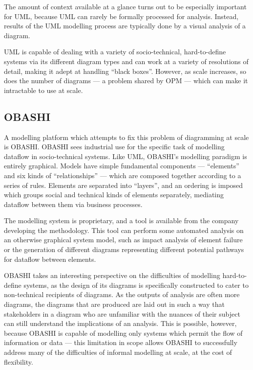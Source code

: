 \documentclass[draft]{article}
\begin{document}
The amount of context available at a glance turns out to be especially important
for UML, because UML can rarely be formally processed for analysis. Instead,
results of the UML modelling process are typically done by a visual analysis of
a diagram.\par

UML is capable of dealing with a variety of socio-technical, hard-to-define
systems via its different diagram types and can work at a variety of resolutions
of detail, making it adept at handling ``black boxes''. However, as scale
increases, so does the number of diagrams --- a problem shared by OPM --- which
can make it intractable to use at scale.\par

\subsection{OBASHI}
\label{subsec:obashi}
A modelling platform which attempts to fix this problem of diagramming at
scale is OBASHI\cite{obashi_methodology}. OBASHI sees industrial use for the
specific task of modelling dataflow in socio-technical systems. Like UML,
OBASHI's modelling paradigm is entirely graphical. Models have simple
fundamental components --- ``elements'' and six kinds of ``relationships'' ---
which are composed together according to a series of rules. Elements are
separated into ``layers'', and an ordering is imposed which groups social and
technical kinds of elements separately, mediating dataflow between them via
business processes.\par

The modelling system is proprietary, and a tool is available from the company
developing the methodology. This tool can perform some automated analysis on an
otherwise graphical system model, such as impact analysis of element failure or
the generation of different diagrams representing different potential pathways
for dataflow between elements.\par

OBASHI takes an interesting perspective on the difficulties of modelling
hard-to-define systems, as the design of its diagrams is specifically
constructed to cater to non-technical recipients of diagrams. As the outputs of
analysis are often more diagrams, the diagrams that are produced are laid out in
such a way that stakeholders in a diagram who are unfamiliar with the nuances of
their subject can still understand the implications of an analysis. This is
possible, however, because OBASHI is capable of modelling only systems which
permit the flow of information or data --- this limitation in scope allows
OBASHI to successfully address many of the difficulties of informal modelling at
scale, at the cost of flexibility.\par
\end{document}
